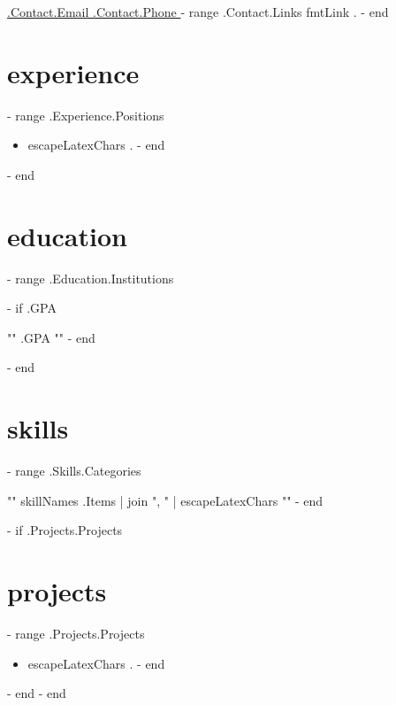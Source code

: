 \documentclass{default}
\begin{document}
\pagestyle{empty}
\hfill {\href{mailto:{{ .Contact.Email }}}{ {{ .Contact.Email }} }} \hfill \textbar \hfill {\href{tel:{{ .Contact.Phone }}}{ {{ .Contact.Phone }} }} \hfill
{{- range .Contact.Links }}
    \textbar \hfill{ {{fmtLink .}} } \hfill
{{- end }}
\section*{experience}
{{- range .Experience.Positions }}
\begin{itemize}
{{- range .Highlights }}
\item {{ escapeLatexChars . }}
{{- end }}
\end{itemize}
{{- end }}
\section*{education}
{{- range .Education.Institutions }}
\begin{description}
{{- if .GPA }}
\item[GPA:]{{ "{" }}{{ .GPA }}{{ "}" }}
{{- end }}
\end{description}
{{- end }}
\section*{skills}
\begin{description}
{{- range .Skills.Categories }}
\item[{{ .Name | escapeLatexChars }}:]{{ "{" }}{{ skillNames .Items | join ", " | escapeLatexChars }}{{ "}" }}
{{- end }}
\end{description}
{{- if .Projects.Projects }}
\section*{projects}
{{- range .Projects.Projects }}
\begin{itemize}
{{- range .Highlights }}
\item {{ escapeLatexChars . }}
{{- end }}
\end{itemize}
{{- end }}
{{- end }}
\end{document}
